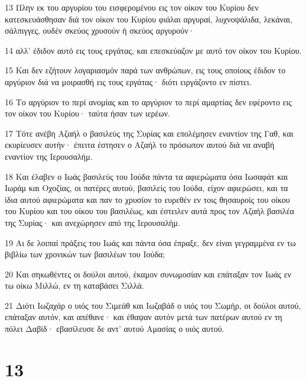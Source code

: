 \par 13 Πλην εκ του αργυρίου του εισφερομένου εις τον οίκον του Κυρίου δεν κατεσκευάσθησαν διά τον οίκον του Κυρίου φιάλαι αργυραί, λυχνοψάλιδα, λεκάναι, σάλπιγγες, ουδέν σκεύος χρυσούν ή σκεύος αργυρούν·
\par 14 αλλ' έδιδον αυτό εις τους εργάτας, και επεσκεύαζον με αυτό τον οίκον του Κυρίου.
\par 15 Και δεν εζήτουν λογαριασμόν παρά των ανθρώπων, εις τους οποίους έδιδον το αργύριον διά να μοιρασθή εις τους εργάτας· διότι ειργάζοντο εν πίστει.
\par 16 Το αργύριον το περί ανομίας και το αργύριον το περί αμαρτίας δεν εφέροντο εις τον οίκον του Κυρίου· ταύτα ήσαν των ιερέων.
\par 17 Τότε ανέβη Αζαήλ ο βασιλεύς της Συρίας και επολέμησεν εναντίον της Γαθ, και εκυρίευσεν αυτήν· έπειτα έστησεν ο Αζαήλ το πρόσωπον αυτού διά να αναβή εναντίον της Ιερουσαλήμ.
\par 18 Και έλαβεν ο Ιωάς βασιλεύς του Ιούδα πάντα τα αφιερώματα όσα Ιωσαφάτ και Ιωράμ και Οχοζίας, οι πατέρες αυτού, βασιλείς του Ιούδα, είχον αφιερώσει, και τα ίδια αυτού αφιερώματα και παν το χρυσίον το ευρεθέν εν τοις θησαυροίς του οίκου του Κυρίου και του οίκου του βασιλέως, και έστειλεν αυτά προς τον Αζαήλ βασιλέα της Συρίας· και ανεχώρησεν από της Ιερουσαλήμ.
\par 19 Αι δε λοιπαί πράξεις του Ιωάς και πάντα όσα έπραξε, δεν είναι γεγραμμένα εν τω βιβλίω των χρονικών των βασιλέων του Ιούδα;
\par 20 Και σηκωθέντες οι δούλοι αυτού, έκαμον συνωμοσίαν και επάταξαν τον Ιωάς εν τω οίκω Μιλλώ, εν τη καταβάσει Σιλλά.
\par 21 Διότι Ιωζαχάρ ο υιός του Σιμεάθ και Ιωζαβάδ ο υιός του Σωμήρ, οι δούλοι αυτού, επάταξαν αυτόν, και απέθανε· και έθαψαν αυτόν μετά των πατέρων αυτού εν τη πόλει Δαβίδ· εβασίλευσε δε αντ' αυτού Αμασίας ο υιός αυτού.

\chapter{13}

